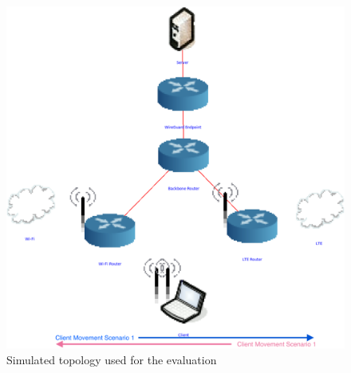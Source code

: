 \begin{figure}[ht]
    \centering
    \includegraphics[width=.9\columnwidth]{figures/migration/topo.png}
    \caption{Simulated topology used for the evaluation}
    \label{fig:eval:mig:topo}
\end{figure}

